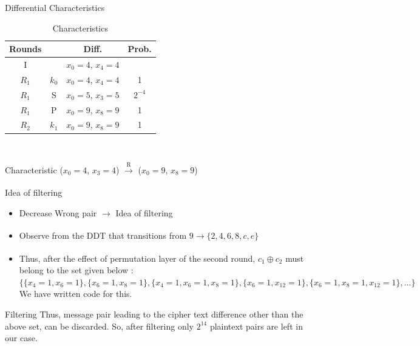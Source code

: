 \begin{frame}{Differential Characteristics}
\begin{table}[h!]
	\caption{Characteristics}
	\centering
	\begin{tabular}{ |c||c|c|c| }
		\hline
		Rounds & & Diff. & Prob. \\ \hline \hline
		I& & $x_0 = 4$, $x_4 = 4$ &  \\ 
		$R_1$& $k_0$ & $x_0 = 4$, $x_4 = 4$ & 1 \\
		$R_1$& S & $x_0 = 5$, $x_{3} = 5$ & $2^{-4}$ \\
		$R_1$& P & $x_0 = 9$, $x_{8} = 9$ & 1 \\
		$R_2$& $k_1$ & $x_0 = 9$, $x_{8} = 9$ & 1 \\ \hline
	\end{tabular}\\
\end{table}
\begin{block}{Characteristic}
        ($x_0 = 4$, $x_3 = 4$) $\xrightarrow[]{\text{R}}$ ($x_0 = 9$, $x_8 = 9$)
    \end{block}
\end{frame}


\begin{frame}{Idea of filtering}
\begin{itemize}
        \item Decrease Wrong pair $\xrightarrow[]{}$ Idea of filtering
        \item Observe from the DDT that transitions from $9 \xrightarrow[]{} \{2,4,6,8,c,e\}$
        \item Thus, after the effect of permutation layer of the second round, $c_1 \oplus c_2$ must belong to the set given below : \\ 
        $\{\{x_4=1,x_6=1\},\{x_6=1,x_8=1\},\{x_4=1,x_6=1,x_8=1\},\{x_6=1,x_{12}=1\},\{x_6=1,x_8=1,x_{12}=1\},...\}$ We have written code for this.
    \end{itemize}
    \begin{block}{Filtering}
        Thus, message pair leading to the cipher text difference other than the above set, can be discarded. 
        So, after filtering only $2^{14}$ plaintext pairs are left in our case.
    \end{block}
\end{frame}

